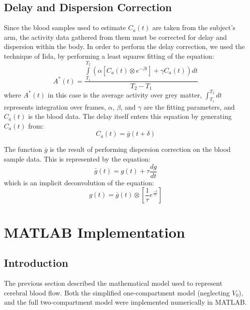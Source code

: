 \subsection{Delay and Dispersion Correction}
\label{sec:blood_correction}

Since the blood samples used to estimate $C_a(t)$ are taken from the
subject's arm, the activity data gathered from them must be corrected
for delay and dispersion within the body.  In order to perform the
delay correction, we used the technique of Iida, by performing a
least squares fitting of the equation:
\begin{equation}
A^{*}(t) = \frac{\int\limits_{T_1}^{T_2} \left( \alpha \left[ C_a(t) \otimes
  e^{-\beta t} \right] + \gamma C_a(t) \right) dt} {T_2 - T_1}
\label{eq:delay_correct}
\end{equation}
where $A^{*}(t)$ in this case is the average activity over grey
matter, $\int_{T_1}^{T_2}dt$ represents integration over frames,
$\alpha$, $\beta$, and $\gamma$ are the fitting parameters, and
$C_a(t)$ is the blood data.  The delay itself enters this equation by
generating $C_a(t)$ from:
\begin{equation}
C_a(t) = \bar{g}(t+\delta)
\label{eq:blood_delay}
\end{equation}

The function $\bar{g}$ is the result of performing dispersion
correction on the blood sample data.  This is represented by the
equation:
\begin{equation}
\bar{g}(t) = g(t) + \tau \frac{dg}{dt}
\label{eq:dispersion_correct}
\end{equation}
which is an implicit deconvolution of the equation:
\begin{equation}
g(t) = \bar{g}(t) \otimes \left[ \frac{1}{\tau} e^{\frac{-t}{\tau}}
\right]
\end{equation}


\newpage
\section{MATLAB Implementation}

\subsection{Introduction}

The previous section described the mathematical model used to
represent cerebral blood flow.  Both the simplified one-compartment
model (neglecting $V_0$), and the full two-compartment model were
implemented numerically in MATLAB.


